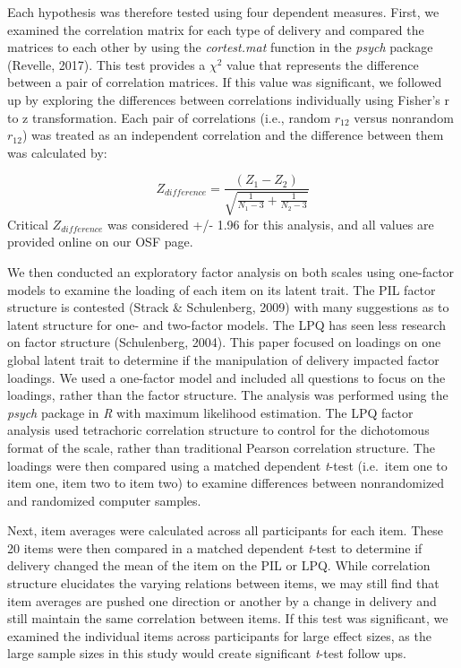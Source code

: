 \documentclass[english,man, mask]{apa6}
\theoremstyle{definition}
\theoremstyle{definition}
\theoremstyle{definition}
\theoremstyle{remark}
\begin{document}
Each hypothesis was therefore tested using four dependent measures.
First, we examined the correlation matrix for each type of delivery and
compared the matrices to each other by using the \emph{cortest.mat}
function in the \emph{psych} package (Revelle, 2017). This test provides
a \(\chi^2\) value that represents the difference between a pair of
correlation matrices. If this value was significant, we followed up by
exploring the differences between correlations individually using
Fisher's r to z transformation. Each pair of correlations (i.e., random
\(r_{12}\) versus nonrandom \(r_{12}\)) was treated as an independent
correlation and the difference between them was calculated by:

\[
Z_{difference} = \frac{(Z_{1} - Z_{2})} { \sqrt{ \frac{1} {N_{1} - 3} + \frac{1} {N_{2} - 3}} }
\] Critical \(Z_{difference}\) was considered +/- 1.96 for this
analysis, and all values are provided online on our OSF page.

We then conducted an exploratory factor analysis on both scales using
one-factor models to examine the loading of each item on its latent
trait. The PIL factor structure is contested (Strack \& Schulenberg,
2009) with many suggestions as to latent structure for one- and
two-factor models. The LPQ has seen less research on factor structure
(Schulenberg, 2004). This paper focused on loadings on one global latent
trait to determine if the manipulation of delivery impacted factor
loadings. We used a one-factor model and included all questions to focus
on the loadings, rather than the factor structure. The analysis was
performed using the \emph{psych} package in \emph{R} with maximum
likelihood estimation. The LPQ factor analysis used tetrachoric
correlation structure to control for the dichotomous format of the
scale, rather than traditional Pearson correlation structure. The
loadings were then compared using a matched dependent \emph{t}-test
(i.e.~item one to item one, item two to item two) to examine differences
between nonrandomized and randomized computer samples.

Next, item averages were calculated across all participants for each
item. These 20 items were then compared in a matched dependent
\emph{t}-test to determine if delivery changed the mean of the item on
the PIL or LPQ. While correlation structure elucidates the varying
relations between items, we may still find that item averages are pushed
one direction or another by a change in delivery and still maintain the
same correlation between items. If this test was significant, we
examined the individual items across participants for large effect
sizes, as the large sample sizes in this study would create significant
\emph{t}-test follow ups.
\end{document}
